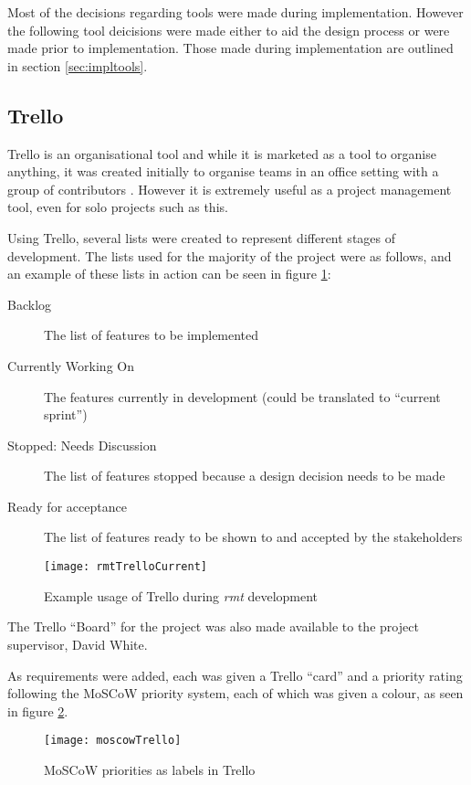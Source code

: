 Most of the decisions regarding tools were made during implementation.
However the following tool deicisions were made either to aid the design process or were made prior to implementation.
Those made during implementation are outlined in section \ref{sec:impltools}.

\subsection{Trello}
\label{sec:trello}
Trello \citep{trello} is an organisational tool and while it is marketed as a tool to organise anything, it was created initially to organise teams in an office setting with a group of contributors \citep{trellolaunch}.
However it is extremely useful as a project management tool, even for solo projects such as this.

Using Trello, several lists were created to represent different stages of development.
The lists used for the majority of the project were as follows, and an example of these lists in action can be seen in figure \ref{fig:trello}:
\begin{description}
	\item[Backlog] The list of features to be implemented
	\item[Currently Working On] The features currently in development (could be translated to ``current sprint'')
	\item[Stopped: Needs Discussion] The list of features stopped because a design decision needs to be made
	\item[Ready for acceptance] The list of features ready to be shown to and accepted by the stakeholders
\end{description}

\begin{figure}[t]
	\centering
	\texttt{[image: rmtTrelloCurrent]}
	\caption{Example usage of Trello during \emph{rmt} development}
	\label{fig:trello}
\end{figure}

The Trello ``Board'' for the project was also made available to the project supervisor, David White.

As requirements were added, each was given a Trello ``card'' and a priority rating following the MoSCoW priority system, each of which was given a colour, as seen in figure \ref{fig:moscow}.

\begin{figure}[t]
	\centering
	\texttt{[image: moscowTrello]}
	\caption{MoSCoW priorities as labels in Trello}
	\label{fig:moscow}
\end{figure}


